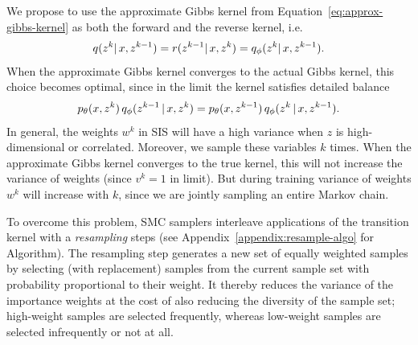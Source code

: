 \documentclass{article}
\theoremstyle{definition}
\begin{document}
We propose to use the approximate Gibbs kernel from Equation~\ref{eq:approx-gibbs-kernel} as both the forward and the reverse kernel, i.e.
\begin{align*}
    q(z^{k} |\, x, z^{k-1}) = r(z^{k-1} |\, x, z^k) = q_\phi(z^k |\, x, z^{k-1}).
\end{align*}
When the approximate Gibbs kernel converges to the actual Gibbs kernel, this choice becomes optimal, since in the limit the kernel satisfies detailed balance 
\begin{align*}
    p_\theta(x, z^k) 
    \,
    q_\phi(z^{k-1} \,|\, x, z^{k})
    =
    p_\theta(x, z^{k-1}) 
    \,
    q_\phi(z^{k} \,|\, x, z^{k-1}).
\end{align*}
In general, the weights $w^k$ in SIS will have a high variance when $z$ is high-dimensional or correlated. Moreover, we sample these variables $k$ times. When the approximate Gibbs kernel converges to the true kernel, this will not increase the variance of weights (since $v^k=1$ in limit). But during training variance of weights $w^k$ will increase with $k$, since we are jointly sampling an entire Markov chain.



To overcome this problem, SMC samplers interleave applications of the transition kernel with a \emph{resampling} steps (see Appendix~\ref{appendix:resample-algo} for Algorithm). The resampling step generates a new set of equally weighted samples by selecting (with replacement) samples from the current sample set with probability proportional to their weight.
It thereby reduces the variance of the importance weights at the cost of also reducing the diversity of the sample set; high-weight samples are selected frequently, whereas low-weight samples are selected infrequently or not at all.
\end{document}
